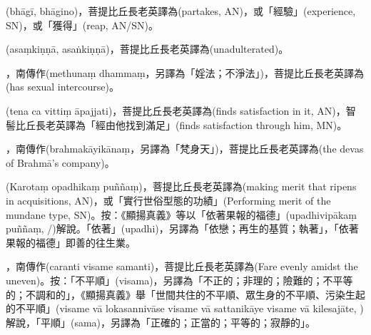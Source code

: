 \startitemgroup[noteitems]
\item{}(bhāgī, bhāgino)，菩提比丘長老英譯為(partakes, AN)，或「經驗」(experience, SN)，或「獲得」(reap, AN/SN)。
\stopitemgroup

\startitemgroup[noteitems]
\item{}(asaṃkiṇṇā, asaṅkiṇṇā)，菩提比丘長老英譯為(unadulterated)。
\stopitemgroup

\startitemgroup[noteitems]
\item{}，南傳作(methunaṃ dhammaṃ，另譯為「婬法；不淨法」)，菩提比丘長老英譯為(has sexual intercourse)。
\stopitemgroup

\startitemgroup[noteitems]
\item{}(tena ca vittiṃ āpajjati)，菩提比丘長老英譯為(finds satisfaction in it, AN)，智髻比丘長老英譯為「經由他找到滿足」(finds satisfaction through him, MN)。
\stopitemgroup

\startitemgroup[noteitems]
\item{}，南傳作(brahmakāyikānaṃ，另譯為「梵身天」)，菩提比丘長老英譯為(the devas of Brahmā's company)。
\stopitemgroup

\startitemgroup[noteitems]
\item{}(Karotaṃ opadhikaṃ puññaṃ)，菩提比丘長老英譯為(making merit that ripens in acquisitions, AN)，或「實行世俗型態的功績」(Performing merit of the mundane type, SN)。按：《顯揚真義》等以「依著果報的福德」(upadhivipākaṃ puññaṃ, /)解說。「依著」(upadhi)，另譯為「依戀；再生的基質；執著」，「依著果報的福德」即善的往生業。 
\stopitemgroup

\startitemgroup[noteitems]
\item{}，南傳作(caranti visame samanti)，菩提比丘長老英譯為(Fare evenly amidst the uneven)。按：「不平順」(visama)，另譯為「不正的；非理的；險難的；不平等的；不調和的」，《顯揚真義》舉「世間共住的不平順、眾生身的不平順、污染生起的不平順」(visame vā lokasannivāse visame vā sattanikāye visame vā kilesajāte, )解說，「平順」(sama)，另譯為「正確的；正當的；平等的；寂靜的」。
\stopitemgroup


